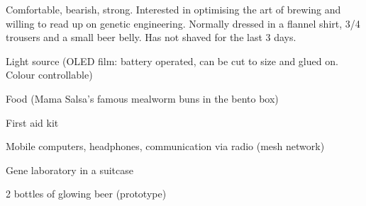 \begin{npcBox}[title=The Barrel]
    \begin{consequences}
    \item {}
    \item {}
    \item {}
    \end{consequences}

    \begin{npcDescription}
    Comfortable, bearish, strong. Interested in optimising the art of brewing and willing to read up on genetic engineering. Normally dressed in a flannel shirt, 3/4 trousers and a small beer belly. Has not shaved for the last 3 days.
    \end{npcDescription}


    \begin{equipment}
    \item Light source (OLED film: battery operated, can be cut to size and glued on. Colour controllable)
    \item Food (Mama Salsa's famous mealworm buns in the bento box)
    \item First aid kit
    \item Mobile computers, headphones, communication via radio (mesh network)
    \item Gene laboratory in a suitcase
    \item 2 bottles of glowing beer (prototype)
    \end{equipment}
\end{npcBox}


